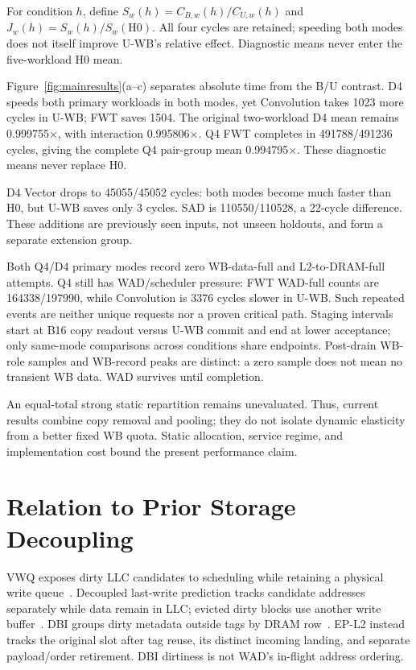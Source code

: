 \documentclass[conference,letterpaper]{IEEEtran}
\begin{document}
For condition $h$, define $S_w(h)=C_{B,w}(h)/C_{U,w}(h)$ and $J_w(h)=S_w(h)/S_w(\mathrm{H0})$. All four cycles are retained; speeding both modes does not itself improve U-WB's relative effect. Diagnostic means never enter the five-workload H0 mean.

Figure~\ref{fig:mainresults}(a--c) separates absolute time from the B/U contrast. D4 speeds both primary workloads in both modes, yet Convolution takes 1023 more cycles in U-WB; FWT saves 1504. The original two-workload D4 mean remains 0.999755$\times$, with interaction 0.995806$\times$. Q4 FWT completes in 491788/491236 cycles, giving the complete Q4 pair-group mean 0.994795$\times$. These diagnostic means never replace H0.

D4 Vector drops to 45055/45052 cycles: both modes become much faster than H0, but U-WB saves only 3 cycles. SAD is 110550/110528, a 22-cycle difference. These additions are previously seen inputs, not unseen holdouts, and form a separate extension group.

Both Q4/D4 primary modes record zero WB-data-full and L2-to-DRAM-full attempts. Q4 still has WAD/scheduler pressure: FWT WAD-full counts are 164338/197990, while Convolution is 3376 cycles slower in U-WB. Such repeated events are neither unique requests nor a proven critical path. Staging intervals start at B16 copy readout versus U-WB commit and end at lower acceptance; only same-mode comparisons across conditions share endpoints. Post-drain WB-role samples and WB-record peaks are distinct: a zero sample does not mean no transient WB data. WAD survives until completion.

An equal-total strong static repartition remains unevaluated. Thus, current results combine copy removal and pooling; they do not isolate dynamic elasticity from a better fixed WB quota. Static allocation, service regime, and implementation cost bound the present performance claim.

\section{Relation to Prior Storage Decoupling}
VWQ exposes dirty LLC candidates to scheduling while retaining a physical write queue~\cite{vwq}. Decoupled last-write prediction tracks candidate addresses separately while data remain in LLC; evicted dirty blocks use another write buffer~\cite{lastwrite}. DBI groups dirty metadata outside tags by DRAM row~\cite{dbi}. EP-L2 instead tracks the original slot after tag reuse, its distinct incoming landing, and separate payload/order retirement. DBI dirtiness is not WAD's in-flight address ordering.
\end{document}
